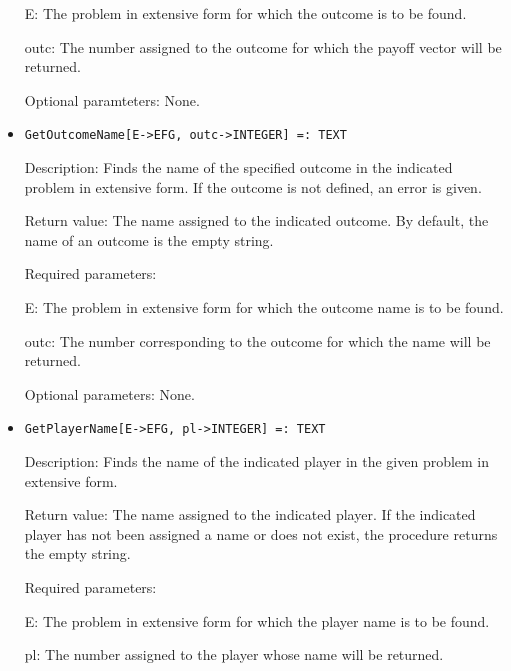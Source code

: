 \begin{itemize}
\bd
\item
[E:] The problem in extensive form for which the outcome is to be
found.
\item
[outc:] The number assigned to the outcome for which the payoff vector
will be returned.
\ed

\item
[Optional paramteters:] None.
\ed

\item
\protect \large \begin{verbatim}
GetOutcomeName[E->EFG, outc->INTEGER] =: TEXT
\end{verbatim}\normalsize

\bd

\item
[Description:] Finds the name of the specified outcome in the
indicated problem in extensive form.  If the outcome is not defined,
an error is given.
\item
[Return value:] The name assigned to the indicated outcome.  By
default, the name of an outcome is the empty string.
\item
[Required parameters:]\hfil\null

\bd
\item	  
[E:] The problem in extensive form for which the outcome name is to be
found.
\item
[outc:] The number corresponding to the outcome for which the name
will be returned.
\ed

\item
[Optional parameters:] None.
\ed

\item
\protect \large \begin{verbatim}
GetPlayerName[E->EFG, pl->INTEGER] =: TEXT
\end{verbatim}\normalsize

\bd
\item
[Description:] Finds the name of the indicated player in the given
problem in extensive form.
\item
[Return value:] The name assigned to the indicated player.  If the
indicated player has not been assigned a name or does not exist, the
procedure returns the empty string.
\item
[Required parameters:]\hfil\null

\bd
\item  
[E:] The problem in extensive form for which the player name is to be
found.
\item
[pl:] The number assigned to the player whose name will be returned.
\ed


\end{itemize}
